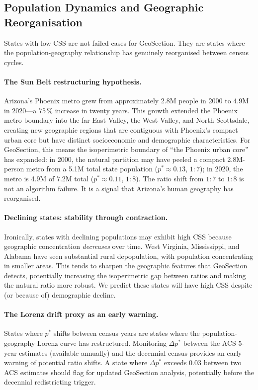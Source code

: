 \subsection{Population Dynamics and Geographic Reorganisation}
\label{sec:pop-dynamics}

States with low CSS are not failed cases for GeoSection.
They are states where the population-geography relationship has genuinely
reorganised between census cycles.

\paragraph{The Sun Belt restructuring hypothesis.}
Arizona's Phoenix metro grew from approximately 2.8M people in 2000 to
4.9M in 2020---a 75\,\% increase in twenty years.
This growth extended the Phoenix metro boundary into the far East Valley,
the West Valley, and North Scottsdale, creating new geographic regions that
are contiguous with Phoenix's compact urban core but have distinct
socioeconomic and demographic characteristics.
For GeoSection, this means the isoperimetric boundary of ``the Phoenix urban
core'' has expanded: in 2000, the natural partition may have peeled a compact
2.8M-person metro from a 5.1M total state population ($p^* \approx 0.13$, $1:7$);
in 2020, the metro is 4.9M of 7.2M total ($p^* \approx 0.11$, $1:8$).
The ratio shift from $1:7$ to $1:8$ is not an algorithm failure.
It is a signal that Arizona's human geography has reorganised.

\paragraph{Declining states: stability through contraction.}
Ironically, states with declining populations may exhibit high CSS because
geographic concentration \emph{decreases} over time.
West Virginia, Mississippi, and Alabama have seen substantial rural
depopulation, with population concentrating in smaller areas.
This tends to sharpen the geographic features that GeoSection detects,
potentially increasing the isoperimetric gap between ratios and making the
natural ratio more robust.
We predict these states will have high CSS despite (or because of)
demographic decline.

\paragraph{The Lorenz drift proxy as an early warning.}
States where $p^*$ shifts between census years are states where the
population-geography Lorenz curve has restructured.
Monitoring $\Delta p^*$ between the ACS 5-year estimates (available annually)
and the decennial census provides an early warning of potential ratio shifts.
A state where $\Delta p^*$ exceeds $0.03$ between two ACS estimates should
flag for updated GeoSection analysis, potentially before the decennial
redistricting trigger.

